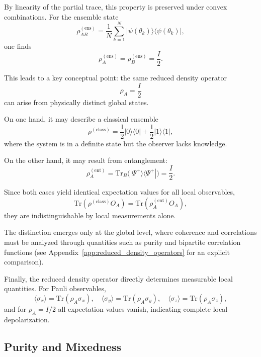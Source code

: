 \documentclass[a4paper]{article}
\begin{document}
\medskip

By linearity of the partial trace, this property is preserved under convex combinations. For the ensemble state
\[
\rho_{AB}^{(\mathrm{ens})}
=
\frac{1}{N}
\sum_{k=1}^{N}
|\psi(\theta_k)\rangle\langle\psi(\theta_k)|,
\]
one finds
\[
\rho_A^{(\mathrm{ens})} = \rho_B^{(\mathrm{ens})} = \frac{I}{2}.
\]

\medskip

This leads to a key conceptual point: the same reduced density operator
\[
\rho_A = \frac{I}{2}
\]
can arise from physically distinct global states.

\medskip

On one hand, it may describe a classical ensemble
\[
\rho^{(\mathrm{class})}
=
\frac{1}{2}|0\rangle\langle 0|
+
\frac{1}{2}|1\rangle\langle 1|,
\]
where the system is in a definite state but the observer lacks knowledge.

On the other hand, it may result from entanglement:
\[
\rho_A^{(\mathrm{ent})}
=
\mathrm{Tr}_B\big(|\Psi^+\rangle\langle\Psi^+|\big)
=
\frac{I}{2}.
\]

\medskip

Since both cases yield identical expectation values for all local observables,
\[
\mathrm{Tr}(\rho^{(\mathrm{class})} O_A)
=
\mathrm{Tr}(\rho_A^{(\mathrm{ent})} O_A),
\]
they are indistinguishable by local measurements alone.

The distinction emerges only at the global level, where coherence and correlations must be analyzed through quantities such as purity and bipartite correlation functions (see Appendix~\ref{app:reduced_density_operators} for an explicit comparison).

\medskip

Finally, the reduced density operator directly determines measurable local quantities. For Pauli observables,
\[
\langle \sigma_x \rangle = \mathrm{Tr}(\rho_A \sigma_x), \quad
\langle \sigma_y \rangle = \mathrm{Tr}(\rho_A \sigma_y), \quad
\langle \sigma_z \rangle = \mathrm{Tr}(\rho_A \sigma_z),
\]
and for \( \rho_A = I/2 \) all expectation values vanish, indicating complete local depolarization.


\subsection{Purity and Mixedness}
\end{document}
